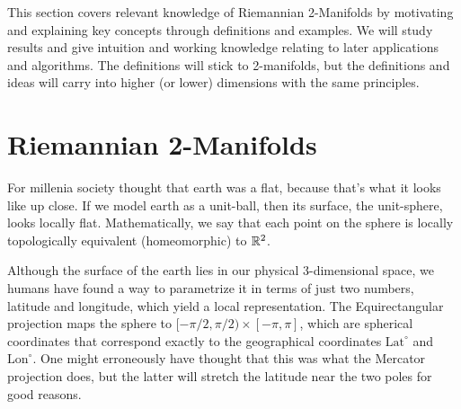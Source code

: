 \ifdefined\COMPILINGFROMMAIN
\else
    
    
\fi

This section covers relevant knowledge of Riemannian 2-Manifolds by motivating and explaining key concepts through definitions and examples. We will study results and give intuition and working knowledge relating to later applications and algorithms. The definitions will stick to 2-manifolds, but the definitions and ideas will carry into higher (or lower) dimensions with the same principles. 

\section*{Riemannian 2-Manifolds}

For millenia society thought that earth was a flat, because that's what it looks like up close. If we model earth as a unit-ball, then its surface, the unit-sphere, looks locally flat. Mathematically, we say that each point on the sphere is locally topologically equivalent (homeomorphic) to $\mathbb{R}^2$.

Although the surface of the earth lies in our physical 3-dimensional space, we humans have found a way to parametrize it in terms of just two numbers, latitude and longitude, which yield a local representation. The Equirectangular projection maps the sphere to $[-\pi/2, \pi/2) \times [-\pi, \pi]$, which are spherical coordinates that correspond exactly to the geographical coordinates $\text{Lat}^\circ$ and $\text{Lon}^\circ$. One might erroneously have thought that this was what the Mercator projection does, but the latter will stretch the latitude near the two poles for good reasons.
    
